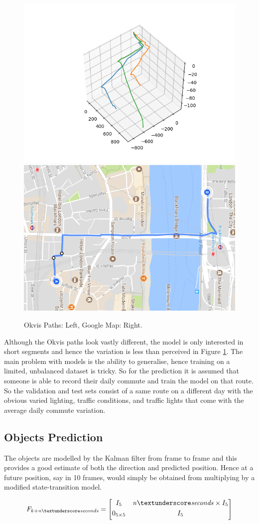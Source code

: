 \documentclass[11pt,twoside]{report}
\begin{document}
\noindent \begin{figure}[h!]
	\includegraphics[width = 0.5\hsize]{figures/blackfriars_okvis_plot.png}
	\includegraphics[width = 0.5\hsize]{figures/blackfriars_map.png}
	\caption{Okvis Paths: Left, Google Map: Right.}
	\label{blackfriars_maps}
\end{figure}

Although the Okvis paths look vastly different, the model is only interested in short segments and hence the variation is less than perceived in Figure \ref{blackfriars_maps}. The main problem with models is the ability to generalise, hence training on a limited, unbalanced dataset is tricky. So for the prediction it is assumed that someone is able to record their daily commute and train the model on that route. So the validation and test sets consist of a same route on a different day with the obvious varied lighting, traffic conditions, and traffic lights that come with the average daily commute variation.

\subsection{Objects Prediction} \label{object_model}
The objects are modelled by the Kalman filter from frame to frame and this provides a good estimate of both the direction and predicted position. Hence at a future position, say in 10 frames, would simply be obtained from multiplying by a modified state-transition model.

\begin{equation}
F_{k+\mathit{n \textunderscore seconds}} = 
\begin{bmatrix}
I_{5} & \mathit{n \textunderscore seconds} \times I_{5} \\[0.3em]

0_{5 \times 5} & I_{5} \\[0.3em]
\end{bmatrix}
\end{equation}
\end{document}
